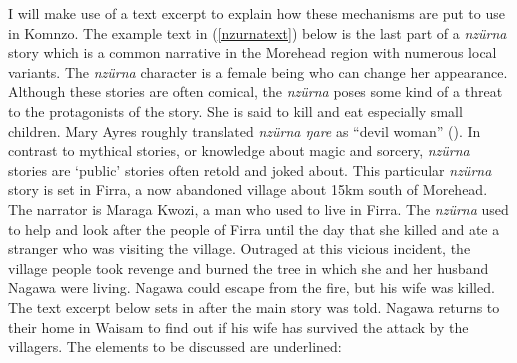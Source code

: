 I will make use of a text excerpt to explain how these mechanisms are put to use in Komnzo. The example text in (\ref{nzurnatext}) below is the last part of a \emph{nzürna} story which is a common narrative in the Morehead region with numerous local variants. The \emph{nzürna} character is a female being who can change her appearance. Although these stories are often comical, the \emph{nzürna} poses some kind of a threat to the protagonists of the story. She is said to kill and eat especially small children. Mary Ayres roughly translated \emph{nzürna ŋare} as ``devil woman'' (\citeyear[93]{Ayres:ws}). In contrast to mythical stories, or knowledge about magic and sorcery, \emph{nzürna} stories are `public' stories often retold and joked about. This particular \emph{nzürna} story is set in Firra, a now abandoned village about 15km south of Morehead. The narrator is Maraga Kwozi, a man who used to live in Firra. The \emph{nzürna} used to help and look after the people of Firra until the day that she killed and ate a stranger who was visiting the village. Outraged at this vicious incident, the village people took revenge and burned the tree in which she and her husband Nagawa were living. Nagawa could escape from the fire, but his wife was killed. The text excerpt below sets in after the main story was told. Nagawa returns to their home in Waisam to find out if his wife has survived the attack by the villagers. The elements to be discussed are underlined:

